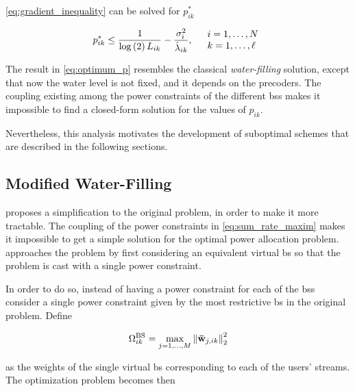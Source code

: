 \noindent
\eqref{eq:gradient_inequality} can be solved for $p_{ik}^\ast$

\begin{equation} \label{eq:optimum_p}
    p_{ik}^\ast \leq \frac{1}{\log\left(2\right)L_{ik}} - \frac{\sigma_i^2}
    {\hat{\lambda}_{ik}}, \quad
	\begin{array}{l}
        i = 1, \ldots, N\\
        k = 1, \ldots, \ell
	\end{array}\\
\end{equation}

The result in \eqref{eq:optimum_p} resembles the classical \emph{water-filling}
solution, except that now the water level is not fixed, and it depends on the
precoders. The coupling existing among the power constraints of the different
\glspl{bs} makes it impossible to find a closed-form solution for the values of
$p_{ik}$.

Nevertheless, this analysis motivates the development of suboptimal schemes that are described in the following sections.

\subsection{Modified Water-Filling}\label{ssec:modified_wf}

\cite{armada11b} proposes a simplification to the original problem, in order to
make it more tractable. The coupling of the power constraints in
\eqref{eq:sum_rate_maxim} makes it impossible to get a simple solution for the
optimal power allocation problem. \cite{armada11b} approaches the problem by
first considering an equivalent virtual \gls{bs} so that the problem is cast
with a single power constraint.

In order to do so, instead of having a power constraint for each of the
\glspl{bs} consider a single power constraint given by the most restrictive
\gls{bs} in the original problem. Define

\begin{equation} \label{eq:equiv_bs}
    \Omega_{ik}^{\text{BS}} = \max\limits_{j=1, \ldots,M} \left\|\mathbf{\bar{w}}_{j,ik} \right\|_2^2
\end{equation}

\noindent
as the weights of the single virtual \gls{bs} corresponding to each of the
users' streams. The optimization problem becomes then

